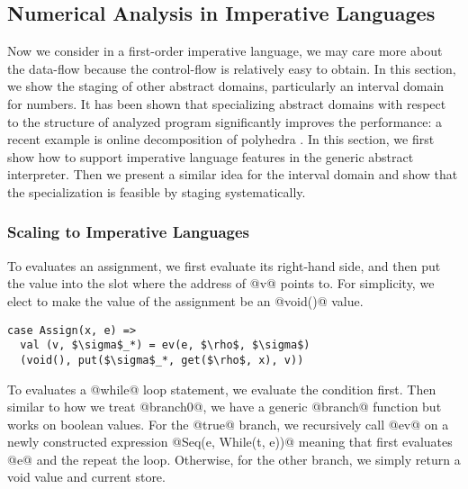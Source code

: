 \iffalse
Another perspective: programs are data for an abstract interpreter, so if we
have $n$ programs, then maybe there can be $n$ stages. Probably we can analyze
first $m$ programs, and generate a residual abstract interpreter waiting for the
rest $(n-m)$ programs. These $(n-m)$ programs might be (abstract) arguments for
the first $n$ programs, and the abstract interpreter itself might be a partial
abstract interpreter.
\fi

\subsection{Numerical Analysis in Imperative Languages} \label{cases_imp}

Now we consider in a first-order imperative language, we may care more about the
data-flow because the control-flow is relatively easy to obtain. In this
section, we show the staging of other abstract domains, particularly an interval
domain for numbers. It has been shown that specializing abstract domains with
respect to the structure of analyzed program significantly improves the
performance: a recent example is online decomposition of polyhedra
\cite{DBLP:conf/popl/SinghPV17, Singh:2017:PCD:3177123.3158143}. In this
section, we first show how to support imperative language features in the
generic abstract interpreter. Then we present a similar idea for the interval
domain and show that the specialization is feasible by staging systematically.

\subsubsection{Scaling to Imperative Languages}

To evaluates an assignment, we first evaluate its right-hand side, and then put
the value into the slot where the address of @v@ points to. For simplicity, we
elect to make the value of the assignment be an @void()@ value.

\begin{lstlisting}
case Assign(x, e) =>
  val (v, $\sigma$_*) = ev(e, $\rho$, $\sigma$)
  (void(), put($\sigma$_*, get($\rho$, x), v))
\end{lstlisting}

To evaluates a @while@ loop statement, we evaluate the condition first. Then
similar to how we treat @branch0@, we have a generic @branch@ function but works
on boolean values. For the @true@ branch, we recursively call @ev@ on a newly
constructed expression @Seq(e, While(t, e))@ meaning that first evaluates @e@
and the repeat the loop. Otherwise, for the other branch, we simply return a
void value and current store.

